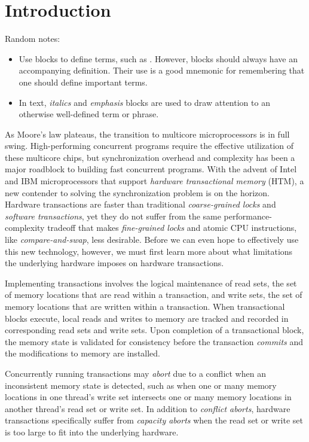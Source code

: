 \section{Introduction}
Random notes:
\begin{itemize}
\item Use  blocks to define terms, such as 
.  However,  
blocks should always have an accompanying definition.  Their
use is a good mnemonic for remembering that one should define
important terms.
\item In text, \textit{italics} and \emph{emphasis} blocks
are used to draw attention to an otherwise well-defined term
or phrase.  
\end{itemize}


As Moore's law plateaus, the transition
to multicore microprocessors is in full swing. High-performing concurrent
programs require the effective utilization of these multicore chips, but 
synchronization overhead and complexity has been a
major roadblock to building fast concurrent programs.
With the advent of Intel and IBM microprocessors that support \textit{hardware
transactional memory} (HTM), a new contender to solving the synchronization problem is
on the horizon. Hardware transactions are faster than traditional
\textit{coarse-grained locks} and \textit{software transactions}, yet they do
not suffer from the same performance-complexity tradeoff that makes
\textit{fine-grained locks} and atomic CPU instructions, like
\textit{compare-and-swap}, less desirable. Before we can even hope to
effectively use this new technology, however, we must first learn more about
what limitations the underlying hardware imposes on hardware transactions.

Implementing transactions involves the logical maintenance of read sets, the set
of memory locations that are read within a transaction, and write sets, the set
of memory locations that are written within a transaction. When transactional
blocks execute, local reads and writes to memory are tracked and recorded in
corresponding read sets and write sets. Upon completion of a transactional
block, the memory state is validated for consistency before the transaction
\textit{commits} and the modifications to memory are installed.

Concurrently running transactions may \textit{abort} due to a conflict when an
inconsistent memory state is detected, such as when one or many memory locations
in one thread's write set intersects one or many memory locations in another
thread's read set or write set. In addition to \textit{conflict aborts},
hardware transactions specifically suffer from \textit{capacity aborts} when the
read set or write set is too large to fit into the underlying hardware.

